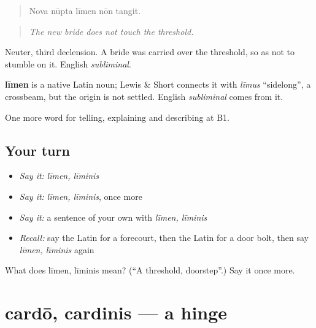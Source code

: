 \begin{quote}
Nova nūpta līmen nōn tangit.
\end{quote}

\begin{quote}
\emph{The new bride does not touch the threshold.}
\end{quote}

Neuter, third declension. A bride was carried over the threshold, so as not to stumble on it. English \emph{subliminal}.

\begin{cousinweb}
\textbf{līmen} is a native Latin noun; Lewis \& Short connects it with \emph{līmus} \textquotedblleft{}sidelong\textquotedblright{}, a crossbeam, but the origin is not settled. English \emph{subliminal} comes from it.
\end{cousinweb}

\begin{grammarlens}[title={What you've built}]
One more word for telling, explaining and describing at B1.
\end{grammarlens}

\subsection*{Your turn}
\begin{itemize}
\raggedright
  \item \emph{Say it:} \emph{līmen, līminis}
  \item \emph{Say it:} \emph{līmen, līminis}, once more
  \item \emph{Say it:} a sentence of your own with \emph{līmen, līminis}
  \item \emph{Recall:} say the Latin for a forecourt, then the Latin for a door bolt, then say \emph{līmen, līminis} again
\end{itemize}

\begin{tcolorbox}[breakable,colback=teal!4,colframe=teal!35!black,title={Before you move on}]
What does līmen, līminis mean? (\textquotedblleft{}A threshold, doorstep\textquotedblright{}.) Say it once more.
\end{tcolorbox}
\section[cardō, cardinis]{cardō, cardinis — a hinge}

\label{lesson:LA-C553-cardo}



